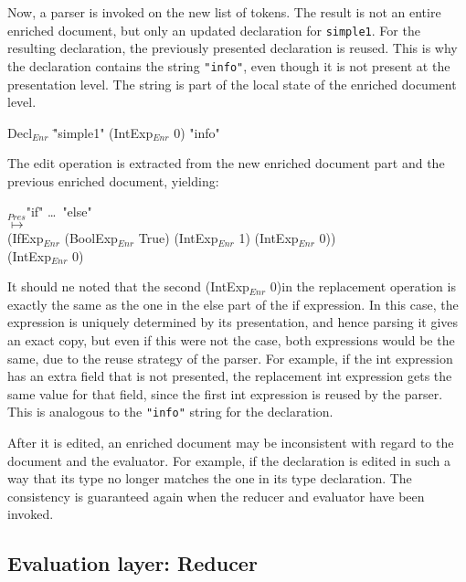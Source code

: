 Now, a parser is invoked on the new list of tokens. The result is not an entire enriched document, but only an updated declaration for \verb|simple1|. For the resulting declaration, the previously presented declaration is reused. This is why the declaration contains the string \verb|"info"|, even though it is not present at the presentation level. The string is part of the local state of the enriched document level.

\small \ttfamily
\begin{tabbing}
Decl$_{Enr}$ \= "simple1" (IntExp$_{Enr}$ 0) "info"
\end{tabbing}
\rmfamily \normalsize

The edit operation is extracted from the new enriched document part and the previous enriched document, yielding:

\small \ttfamily
\begin{tabbing}
$_{Pres}$\ttfamily  "if" \dots~"else"\\
$\mapsto$\\
  \ttfamily (IfExp$_{Enr}$ (BoolExp$_{Enr}$ True) (IntExp$_{Enr}$ 1) (IntExp$_{Enr}$ 0))\\
  \ttfamily (IntExp$_{Enr}$ 0) 
\end{tabbing}
\rmfamily \normalsize

It should ne noted that the second \ttfamily (IntExp$_{Enr}$ 0)\rmfamily in the replacement operation is exactly the same as the one in the else part of the if expression. In this case, the expression is uniquely determined by its presentation, and hence parsing it gives an exact copy, but even if this were not the case, both expressions would be the same, due to the reuse strategy of the parser. For example, if the int expression has an extra field that is not presented, the replacement int expression gets the same value for that field, since the first int expression is reused by the parser. This is analogous to the \verb|"info"| string for the declaration.

After it is edited, an enriched document may be inconsistent with regard to the document and the evaluator. For example, if the declaration is edited in such a way that its type no longer matches the one in its type declaration. The consistency is guaranteed again when the reducer and evaluator have been invoked.

\subsection{Evaluation layer: Reducer} \label{sect:reducer}

